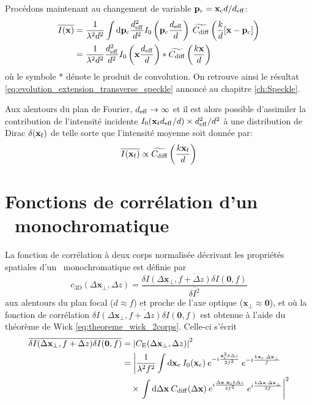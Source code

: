 Procédons maintenant au changement de variable $\mathbf{p}_{\mathrm{c}} = \mathbf{x}_{\mathrm{c}} d/d_{\mathrm{eff}}$:
\begin{align}
\overline{I(\mathbf{x})} &= \frac{1}{\lambda^2d^2} \int{\mathop{}\mathopen{}\mathrm{d}\mathbf{p}_{\mathrm{c}} \frac{d_{\mathrm{eff}}^2}{d^2} I_0\left( \mathbf{p}_{\mathrm{c}} \frac{d_{\mathrm{eff}}}{d}\right) \: \widetilde{C_{\mathrm{diff}}} \left( \frac{k}{d} [\mathbf{x} - \mathbf{p}_{\mathrm{c}}] \right)} \\
&= \frac{1}{\lambda^2 d^2} \frac{d_{\mathrm{eff}}^2}{d^2} I_0\left( \mathbf{x} \frac{d_{\mathrm{eff}}}{d}\right) \ast \widetilde{C_{\mathrm{diff}}}\left( \frac{k\mathbf{x}}{d}\right)
\end{align}
où le symbole $\ast$ dénote le produit de convolution. On retrouve ainsi le résultat \ref{eq:evolution_extension_transverse_speckle} annoncé au chapitre \ref{ch:Speckle}.

Aux alentours du plan de Fourier, $d_{\mathrm{eff}}\rightarrow\infty$ et il est alors possible d'assimiler la contribution de l'intensité incidente $I_0(\mathbf{x}_{\mathrm{f}} d_{\mathrm{eff}}/d) \times d_{\mathrm{eff}}^2/d^2$ à une distribution de Dirac $\delta(\mathbf{x}_{\mathrm{f}})$ de telle sorte que l'intensité moyenne soit donnée par:
\begin{equation}
\overline{I(\mathbf{x}_{\mathrm{f}})} \propto \widetilde{C_{\mathrm{diff}}}\left( \frac{k\mathbf{x}_{\mathrm{f}}}{d}\right)
\end{equation}




\section{Fonctions de corrélation d'un \speckle\ monochromatique}
La fonction de corrélation à deux corps normalisée décrivant les propriétés spatiales d'un \speckle\ monochromatique est définie par 
\begin{equation}
c_{\mathrm{3D}}(\Delta \mathbf{x}_{\perp},\Delta z)=\frac{\overline{\delta I(\Delta \mathbf{x}_{\perp}, f+\Delta z) \delta I(\mathbf{0}, f)}}{\overline{\delta I^2}}
\end{equation}
aux alentours du plan focal ($d\approx f$) et proche de l'axe optique ($\mathbf{x}_{\perp}\approx \mathbf{0}$), et où la fonction de corrélation $\overline{\delta I(\Delta\mathbf{x}_{\perp},f+\Delta z) \delta I(\mathbf{0}, f)}$ est obtenue à l'aide du théorème de Wick \ref{eq:theoreme_wick_2corps}. Celle-ci s'écrit
\begin{align}
\overline{\delta I (\Delta\mathbf{x}_{\perp}, f+\Delta z) \delta I(\mathbf{0},f)} &= {\left|C_{\mathrm{E}}(\Delta\mathbf{x}_{\perp},\Delta z) \right|}^2 \\
&= \left| \frac{1}{\lambda^2 f^2} \int{\mathop{}\mathopen{}\mathrm{d}\mathbf{x}_{\mathrm{c}}\: I_0(\mathbf{x}_{\mathrm{c}}) \: e^{-i\frac{\mathbf{x}_{\mathrm{c}}^2 k \Delta z}{2f^2}} \: e^{-i\frac{k \mathbf{x}_{\mathrm{c}}. \Delta\mathbf{x}_{\perp}}{f}}}\right. \\
&\nonumber \quad\times \left.\int{\mathop{}\mathopen{}\mathrm{d}\Delta\mathbf{x}\: C_{\mathrm{diff}}(\Delta\mathbf{x}) \: e^{i\frac{\Delta\mathbf{x}. \mathbf{x}_{\mathrm{c}}k \Delta z}{2 f^2}} \: e^{i\frac{k\Delta\mathbf{x}. \Delta\mathbf{x}_{\perp}}{2f}}} \right|^2
\end{align}

